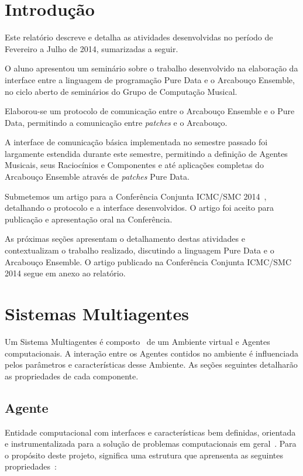 \documentclass[a4paper, 11pt, twoside]{article}
\begin{document}
\begin{multicols}{2}

\section{Introdução}

Este relatório descreve e detalha as atividades desenvolvidas no período de 
Fevereiro a Julho de 2014, sumarizadas a seguir.

O aluno apresentou um seminário sobre o trabalho desenvolvido na elaboração da 
interface entre a linguagem de programação Pure Data e o Arcabouço Ensemble, 
no ciclo aberto de seminários do Grupo de Computação Musical.

Elaborou-se um protocolo de comunicação entre o Arcabouço Ensemble e o
Pure Data, permitindo a comunicação entre \textit{patches} e o Arcabouço.

A interface de comunicação básica implementada no semestre passado foi
largamente estendida durante este semestre, permitindo a definição de
Agentes Musicais, seus Raciocínios e Componentes e até aplicações
completas do Arcabouço Ensemble através de \textit{patches} Pure Data.

Submetemos um artigo para a Conferência Conjunta ICMC/SMC 2014~\cite{},
detalhando o protocolo e a interface desenvolvidos. O artigo foi aceito
para publicação e apresentação oral na Conferência.

As próximas seções apresentam o detalhamento destas atividades e 
contextualizam o trabalho realizado, discutindo a linguagem Pure Data
e o Arcabouço Ensemble. O artigo publicado na Conferência Conjunta ICMC/SMC
2014 segue em anexo ao relatório.

\section{Sistemas Multiagentes}

Um Sistema Multiagentes é composto~\cite{wooldridgeART, jennings99} de um 
Ambiente virtual e Agentes computacionais. A interação entre os Agentes 
contidos no ambiente é influenciada pelos parâmetros e características desse 
Ambiente. As seções seguintes detalharão as propriedades de cada componente.

\subsection{Agente}

Entidade computacional com interfaces e características bem definidas, 
orientada e instrumentalizada para a solução de problemas computacionais em 
geral~\cite{jennings99}. Para o propósito deste projeto, significa uma 
estrutura que aprensenta as seguintes propriedades~\cite{wooldridgeART}:


\end{multicols}
\end{document}
